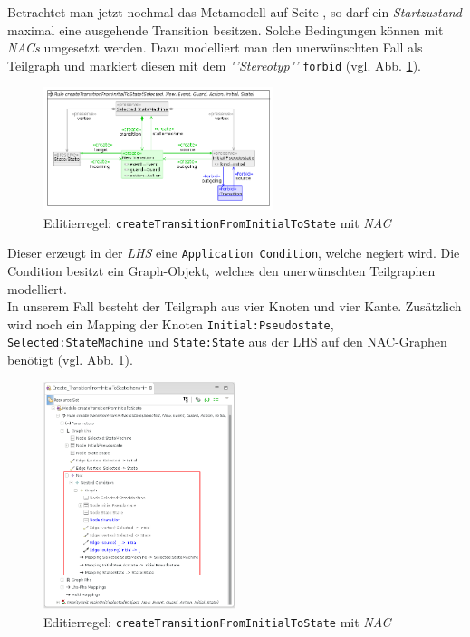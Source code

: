 \documentclass[a4paper]{scrartcl}
\begin{document}
Betrachtet man jetzt nochmal das Metamodell  auf Seite \pageref{subsec:metamodel}, so darf ein \textit{Startzustand} maxi\-mal eine ausgehende Transition besitzen.
Solche Bedingungen können mit \textit{NACs} umgesetzt werden.
Dazu modelliert man den unerwünschten Fall als Teilgraph und markiert diesen mit dem \textit{"'Stereotyp"'} \texttt{forbid} (vgl. Abb. \ref{silift-editrule_create_transitionFromInitialToState_with_forbid}).

\begin{figure}[H]
\centering
\includegraphics[width=0.6\textwidth]{graphics/silift-editrule_create_transitionFromInitialToState_with_forbid.png}
\caption{Editierregel: \texttt{createTransitionFromInitialToState} mit \textit{NAC}}
\label{silift-editrule_create_transitionFromInitialToState_with_forbid}
\end{figure}

Dieser erzeugt in der \textit{LHS} eine \texttt{Application Condition}, welche negiert wird.
Die Condition besitzt ein Graph-Objekt, welches den unerwünschten Teilgraphen modelliert.\\
In unserem Fall besteht der Teilgraph aus vier Knoten und vier Kante.
Zusätzlich wird noch ein Mapping der Knoten \texttt{Initial:Pseudostate}, \texttt{Selected:StateMachine} und \texttt{State:State} aus der LHS auf den NAC-Graphen benötigt (vgl. Abb. \ref{silift-editrule_create_transitionFromInitialToState_with_forbid}).


\begin{figure}[H]
\centering
\includegraphics[width=0.5\textwidth]{graphics/silift-editrule_create_transitionFromInitialToState_with_forbid_treeView.png}
\caption{Editierregel: \texttt{createTransitionFromInitialToState} mit \textit{NAC}}
\label{silift-editrule_create_transitionFromInitialToState_with_forbid_treeView}
\end{figure}
\end{document}
